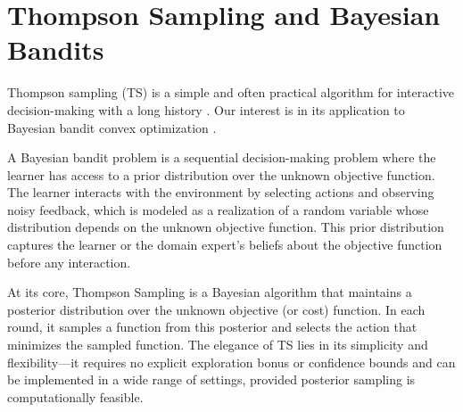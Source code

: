 \documentclass[letter, 12pt]{report}
\newcommand{\1}{\mathbf{1}}
\newcommand{\ts}{\textsc{TS}\xspace}
\theoremstyle{plain}
\theoremstyle{definition}
\theoremstyle{remark}
\begin{document}
\section{Thompson Sampling and Bayesian Bandits}

Thompson sampling (\ts) is a simple and often practical algorithm for interactive
decision-making with a long history \citep{Tho33,RVK17}.
Our interest is in its application to Bayesian bandit convex optimization \citep{lat24book}.

A Bayesian bandit problem is a sequential decision-making problem where the learner has access to a prior distribution over the unknown objective function.
The learner interacts with the environment by selecting actions and observing noisy feedback, which is modeled as a realization of a random variable whose distribution depends on the unknown objective function.
This prior distribution captures the learner or the domain expert's beliefs about the objective function before any interaction.

At its core, Thompson Sampling is a Bayesian algorithm that maintains a posterior distribution over the unknown objective (or cost) function.
In each round, it samples a function from this posterior and selects the action that minimizes the sampled function.
The elegance of \ts lies in its simplicity and flexibility---it requires no explicit exploration bonus or confidence bounds and can be
implemented in a wide range of settings, provided posterior sampling is computationally feasible.
\end{document}
